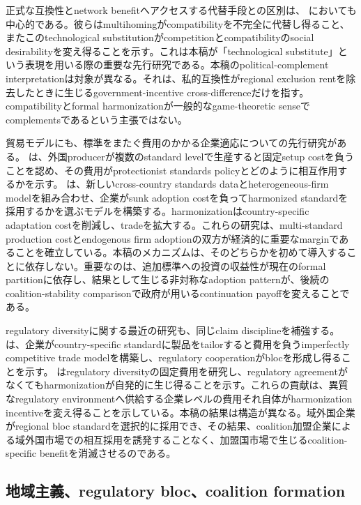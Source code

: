 正式な互換性とnetwork benefitへアクセスする代替手段との区別は、\citet{doganogluWright2006} においても中心的である。彼らはmultihomingがcompatibilityを不完全に代替し得ること、またこのtechnological substitutionがcompetitionとcompatibilityのsocial desirabilityを変え得ることを示す。これは本稿が「technological substitute」という表現を用いる際の重要な先行研究である。本稿のpolitical-complement interpretationは対象が異なる。それは、私的互換性がregional exclusion rentを除去したときに生じるgovernment-incentive cross-differenceだけを指す。compatibilityとformal harmonizationが一般的なgame-theoretic senseでcomplementsであるという主張ではない。

貿易モデルにも、標準をまたぐ費用のかかる企業適応についての先行研究がある。\citet{fischerSerra2000} は、外国producerが複数のstandard levelで生産すると固定setup costを負うことを認め、その費用がprotectionist standards policyとどのように相互作用するかを示す。\citet{schmidtSteingress2022} は、新しいcross-country standards dataとheterogeneous-firm modelを組み合わせ、企業がsunk adoption costを負ってharmonized standardを採用するかを選ぶモデルを構築する。harmonizationはcountry-specific adaptation costを削減し、tradeを拡大する。これらの研究は、multi-standard production costとendogenous firm adoptionの双方が経済的に重要なmarginであることを確立している。本稿のメカニズムは、そのどちらかを初めて導入することに依存しない。重要なのは、追加標準への投資の収益性が現在のformal partitionに依存し、結果として生じる非対称なadoption patternが、後続のcoalition-stability comparisonで政府が用いるcontinuation payoffを変えることである。

regulatory diversityに関する最近の研究も、同じclaim disciplineを補強する。\citet{parentiVannoorenberghe2025} は、企業がcountry-specific standardに製品をtailorすると費用を負うimperfectly competitive trade modelを構築し、regulatory cooperationがblocを形成し得ることを示す。\citet{maggiMrazova2024} はregulatory diversityの固定費用を研究し、regulatory agreementがなくてもharmonizationが自発的に生じ得ることを示す。これらの貢献は、異質なregulatory environmentへ供給する企業レベルの費用それ自体がharmonization incentiveを変え得ることを示している。本稿の結果は構造が異なる。域外国企業がregional bloc standardを選択的に採用でき、その結果、coalition加盟企業による域外国市場での相互採用を誘発することなく、加盟国市場で生じるcoalition-specific benefitを消滅させるのである。

\subsection{地域主義、regulatory bloc、coalition formation}
\label{subsec:lit-coalitions}

